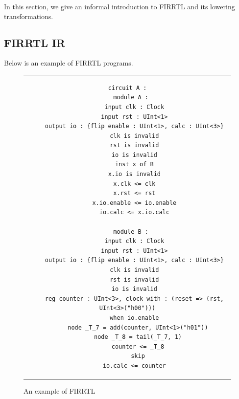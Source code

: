 


In this section, we give an informal introduction to FIRRTL %
and its lowering transformations.

\subsection{FIRRTL IR}


Below is an example of FIRRTL programs.

\begin{figure}[t]
\centering
\begin{tabular}{c}
\begin{lstlisting}[basicstyle=\scriptsize\ttfamily]
circuit A :
  module A :
    input clk : Clock
    input rst : UInt<1>
    output io : {flip enable : UInt<1>, calc : UInt<3>}
    clk is invalid
    rst is invalid
    io is invalid
    inst x of B
    x.io is invalid
    x.clk <= clk
    x.rst <= rst
    x.io.enable <= io.enable
    io.calc <= x.io.calc

  module B :
    input clk : Clock
    input rst : UInt<1>
    output io : {flip enable : UInt<1>, calc : UInt<3>}
    clk is invalid
    rst is invalid
    io is invalid
    reg counter : UInt<3>, clock with : (reset => (rst, UInt<3>("h00")))
    when io.enable
      node _T_7 = add(counter, UInt<1>("h01"))
      node _T_8 = tail(_T_7, 1)
      counter <= _T_8
      skip
    io.calc <= counter
\end{lstlisting}
\end{tabular}
\caption{An example of FIRRTL}
\label{fig:example}
\end{figure}

